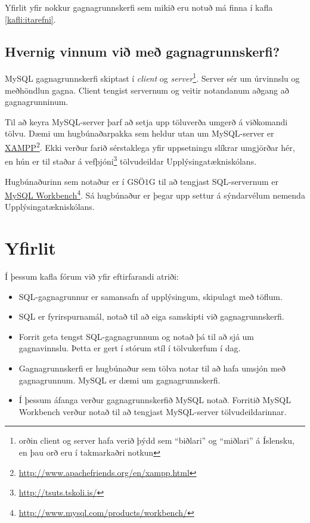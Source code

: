 Yfirlit yfir nokkur gagnagrunnskerfi sem mikið eru notuð má finna í kafla \ref{kafli:itarefni}.
\subsection{Hvernig vinnum við með gagnagrunnskerfi?}
\label{kafli:HvernigVinnumVid}
MySQL gagnagrunnskerfi skiptast í \emph{client} og \emph{server}\footnote{orðin client og server hafa verið þýdd sem ``biðlari'' og ``miðlari'' á Íslensku, en þau orð eru í takmarkaðri notkun}. Server sér um úrvinnslu og meðhöndlun gagna. Client tengist servernum og veitir notandanum aðgang að gagnagrunninum.

Til að keyra MySQL-server þarf að setja upp töluverða umgerð á viðkomandi tölvu. Dæmi um hugbúnaðarpakka sem heldur utan um MySQL-server er \href{http://www.apachefriends.org/en/xampp.html}{XAMPP}\footnote{\url{http://www.apachefriends.org/en/xampp.html}}. Ekki verður farið sérstaklega yfir uppsetningu slíkrar umgjörðar hér, en hún er til staðar á vefþjóni\footnote{\url{http://tsuts.tskoli.is/}} tölvudeildar Upplýsingatækniskólans.

Hugbúnaðurinn sem notaður er í GSÖ$1$G til að tengjast SQL-servernum er \href{http://www.mysql.com/products/workbench/}{MySQL Workbench}\footnote{\url{http://www.mysql.com/products/workbench/}}. Sá hugbúnaður er þegar upp settur á sýndarvélum nemenda Upplýsingatækniskólans.
\section{Yfirlit}
Í þessum kafla fórum við yfir eftirfarandi atriði:
\begin{itemize}
 \item SQL-gagnagrunnur er samansafn af upplýsingum, skipulagt með töflum.
 \item SQL er fyrirspurnamál, notað til að eiga samskipti við gagnagrunnskerfi.
 \item Forrit geta tengst SQL-gagnagrunnum og notað þá til að sjá um gagnavinnslu. Þetta er gert í stórum stíl í tölvukerfum í dag.
 \item Gagnagrunnskerfi er hugbúnaður sem tölva notar til að hafa umsjón með gagnagrunnum. MySQL er dæmi um gagnagrunnskerfi.
 \item Í þessum áfanga verður gagnagrunnskerfið MySQL notað. Forritið MySQL Workbench verður notað til að tengjast MySQL-server tölvudeildarinnar.
\end{itemize}